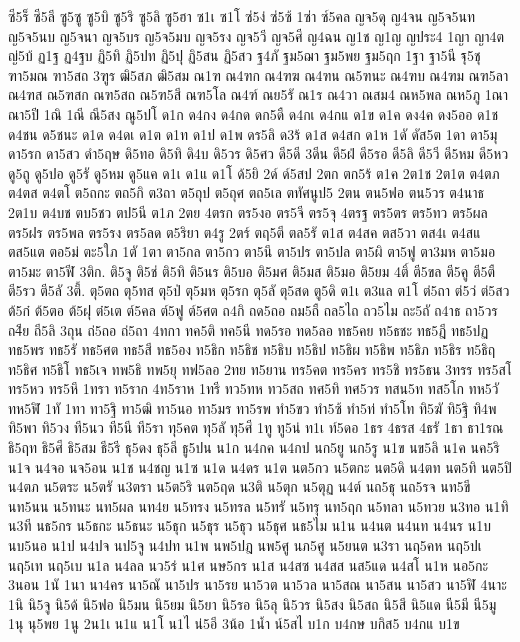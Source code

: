 {ซี5ร็
ซี5ลี
ซู5ซู
ซู5บิ
ซู5ริ
ซู5ลิ
ซู5ฮา
ซ1เ
ซ1โ
ซ่5ง่
ซ่5ซ้
1ซ่า
ซ์5คล
ญจ5ดุ
ญ4จน
ญ5จ5นท
ญ5จ5นบ
ญ5จนา
ญจ5บร
ญ5จ5มบ
ญจ5รง
ญจ5วี
ญจ5ศี
ญ4ฉน
ญ1ช
ญ1ญ
ญประ4
1ญา
ญา4ต
ญ่5บ้
ฏ1ฐ
ฏ4ฐบ
ฏิ5ทิ
ฏิ5ปท
ฏิ5ปุ
ฏิ5สน
ฏิ5สว
ฐ4ภั
ฐม5ฌา
ฐม5พย
ฐม5ฤก
1ฐา
ฐา5นี
ฐุ5ชุ
ฑา5มณ
ฑา5สถ
3ฑูร
ฒิ5สภ
ฒิ5สม
ณ1ฑ
ณ4ฑก
ณ4ฑฆ
ณ4ฑน
ณ5ฑนะ
ณ4ฑบ
ณ4ฑม
ณฑ5ลา
ณ4ฑส
ณ5ฑสก
ณฑ5สถ
ณ5ฑ5สี
ณฑ5โล
ณ4ฑ์
ณย5รั
ณ1ร
ณ4วา
ณสม4
ณห5พล
ณห5ภู
1ณา
ณา5ปี
1ณิ
1ณี
ณี5สง
ณู5ปโ
ด1ก
ด4กง
ด4กด
ดก5ดื
ด4กเ
ด4กแ
ด1ข
ด1ค
ดง4ค
ดง5ออ
ด1ช
ด4ชน
ด5ชนะ
ด1ด
ด4ดเ
ด1ต
ด1ท
ด1ป
ด1พ
ดร5ลิ
ด3ร้
ด1ส
ด4สก
ด1ห
1ดั
ดัส5ต
1ดา
ดา5มุ
ดา5รก
ดา5สว
ดำ5ฤษ
ดิ5ทอ
ดิ5ทิ
ดิ4บ
ดิ5วร
ดิ5ศว
ดี5ดี
3ดีน
ดี5ฝ่
ดี5รอ
ดี5ลิ
ดี5วี
ดี5หม
ดี5หว
ดู5ถู
ดู5ปอ
ดู5รั
ดู5หม
ดู5แค
ด1เ
ด1แ
ด1โ
ด้5ยิ
2ด์
ด์5สป
2ตก
ตก5ร้
ต1ค
2ต1ช
2ต1ต
ต4ตภ
ต4ตส
ต4ตโ
ต5ถกะ
ตถ5กิ
ต3ถา
ต5ถุป
ต5ถุศ
ตถ5เล
ตทัศนูป5
2ตน
ตน5ฟอ
ตน5วร
ต4นาธ
2ต1บ
ต4บช
ตบ5ชว
ตป5นี
ต1ภ
2ตย
4ตรก
ตร5งอ
ตร5จี
ตร5จุ
4ตรฐ
ตร5ตร
ตร5ทว
ตร5ผล
ตร5ฝร
ตร5พล
ตร5รง
ตร5ลด
ต5ริยา
ต4รู
2ตร์
ตฤ5ตี
ตล5รั
ต1ส
ต4สค
ตส5วา
ตส4เ
ต4สแ
ตส5แต
ตอ5ม่
ตะ5ใภ
1ตั
1ตา
ตา5กล
ตา5กว
ตา5นึ
ตา5ปร
ตา5ปล
ตา5ผิ
ตา5ฟู
ตา3มห
ตา5มอ
ตา5มะ
ตา5ฬี
3ติก.
ติ5จู
ติ5ช่
ติ5ทิ
ติ5นร
ติ5บอ
ติ5มศ
ติ5มส
ติ5มอ
ติ5ยม
4ติ์
ตี5ขล
ตี5คู
ตี5ตื
ตี5รว
ตี5ลั
3ตี้.
ตุ5ตถ
ตุ5ทส
ตุ5ป่
ตุ5มห
ตุ5รก
ตุ5ลั
ตุ5สด
ตู5ดิ
ต1เ
ต3แล
ต1โ
ต่5ถา
ต่5ว่
ต่5สว
ต้5ก๋
ต้5ตอ
ต้5ฝุ
ต๋5เต
ต์5คล
ต์5ฟู
ต์5ศต
ถ4กิ
ถด5ถอ
ถม5ถื
ถล5ไถ
ถว5ไม
ถะ5ถั
ถ4าธ
ถา5วร
ถ4ีย
ถี5ลิ
3ถุน
ถ่5ถอ
ถ่5ถา
4ทกา
ทค5ติ
ทค5นี
ทด5รอ
ทด5ลอ
ทธ5คย
ท5ธชะ
ทธ5ฎี
ทธ5ปฏ
ทธ5พร
ทธ5รั
ทธ5ศต
ทธ5สี
ทธ5อง
ท5ธิก
ท5ธิช
ท5ธิบ
ท5ธิป
ท5ธิผ
ท5ธิพ
ท5ธิภ
ท5ธิร
ท5ธิฤ
ท5ธิศ
ท5ธิโ
ทธ5เจ
ทพ5ธิ
ทพ5ยุ
ทฟ5ลอ
2ทย
ท5ยาน
ทร5คต
ทร5คร
ทร5ชิ
ทร5ธน
3ทรร
ทร5สโ
ทร5หว
ทร5หึ
1ทรา
ท5ราก
4ท5ราห
1ทรี
ทว5ทห
ทว5สถ
ทศ5ทิ
ทศ5วร
ทสน5ท
ทส5โก
ทห5วั
ทห5ฬิ
1ทั
1ทา
ทา5ฐิ
ทา5ฒิ
ทา5นอ
ทา5มร
ทา5รพ
ทำ5ขว
ทำ5ซ้
ทำ5ท่
ทำ5โท
ทิ5ฆั
ทิ5ฐิ
ทิ4พ
ทิ5พา
ทิ5วง
ที5นว
ที5นี
ที5รา
ทุ5คต
ทุ5ลั
ทุ5ศี
1ทู
ทู5น่
ท1เ
ท์5ดอ
1ธร
4ธรส
4ธรั
1ธา
ธา1รณ
ธิ5ฤท
ธิ5ศี
ธิ5สม
ธี5รี
ธุ5ดง
ธุ5ลี
ธู5ปน
น1ก
น4กค
น4กป
นก5ยู
นก5รู
น1ข
นข5ลิ
น1ค
นค5ริ
น1จ
น4จอ
นจ5อน
น1ช
น4ชญ
น1ซ
น1ด
น4ดร
น1ต
นต5กว
น5ตกะ
นต5ดิ
น4ตท
นต5ทิ
นต5ปิ
น4ตภ
น5ตระ
น5ตรั
น3ตรา
น5ต5ริ
นต5ฤด
น3ติ
น5ตุก
น5ตุฏ
น4ต์
นถ5ธุ
นถ5รจ
นท5ขี
นท5นน
น5ทนะ
นท5ผล
นท4ย
น5ทรง
น5ทรล
น5ทรั
น5ทรุ
นท5ฤก
น5ทลา
น5ทวย
น3ทอ
น1ทิ
น3ที
นธ5กร
น5ธกะ
น5ธนะ
น5ธุก
น5ธุร
น5ธุว
น5ธุศ
นธ5ไม
น1น
น4นต
น4นท
น4นร
น1บ
นบ5นอ
น1ป
น4ปจ
นป5จู
น4ปท
น1พ
นพ5ปฎ
นพ5ศู
นภ5ศู
น5ยนต
น3รา
นฤ5คห
นฤ5ปเ
นฤ5เท
นฤ5เบ
น1ล
น4ลล
นว5ร่
น1ศ
นษ5กร
น1ส
น4สซ
น4สส
นส5แด
น4สโ
น1ห
นอ5กะ
3นอน
1นั
1นา
นา4คร
นา5ณั
นา5ปร
นา5รย
นา5วต
นา5วล
นา5สณ
นา5สน
นา5สว
นา5ฬิ
4นาะ
1นิ
นิ5จู
นิ5ด้
นิ5ฟอ
นิ5มน
นิ5ยม
นิ5ยา
นิ5รอ
นิ5ลุ
นิ5วร
นิ5สง
นิ5สถ
นิ5สี
นิ5แด
นี5มี
นี5มู
1นุ
นุ5พย
1นู
2น1เ
น1แ
น1โ
น1ไ
น่5อี
3น้อ
1น้ำ
น์5สไ
บ1ก
บ4กษ
บกิส5
บ4กแ
บ1ข
}
